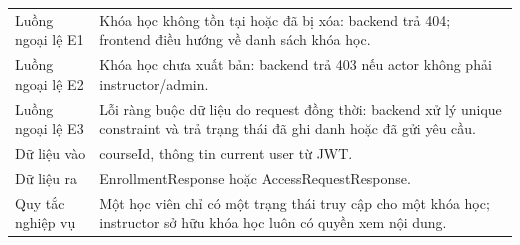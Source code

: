 \documentclass[12pt,a4paper]{report}
\begin{document}
\begin{longtable}{L{4cm} L{10.5cm}}
Luồng ngoại lệ E1 & Khóa học không tồn tại hoặc đã bị xóa: backend trả 404; frontend điều hướng về danh sách khóa học. \\
Luồng ngoại lệ E2 & Khóa học chưa xuất bản: backend trả 403 nếu actor không phải instructor/admin. \\
Luồng ngoại lệ E3 & Lỗi ràng buộc dữ liệu do request đồng thời: backend xử lý unique constraint và trả trạng thái đã ghi danh hoặc đã gửi yêu cầu. \\
Dữ liệu vào & courseId, thông tin current user từ JWT. \\
Dữ liệu ra & EnrollmentResponse hoặc AccessRequestResponse. \\
Quy tắc nghiệp vụ & Một học viên chỉ có một trạng thái truy cập cho một khóa học; instructor sở hữu khóa học luôn có quyền xem nội dung. \\
\bottomrule
\end{longtable}
\end{document}
